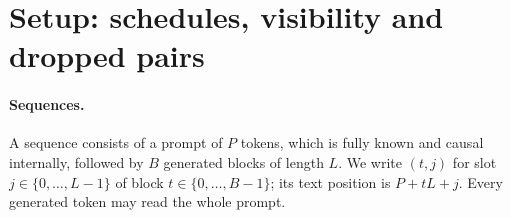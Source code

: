 \documentclass[11pt]{article}
\theoremstyle{definition}
\theoremstyle{remark}
\begin{document}
\section{Setup: schedules, visibility and dropped pairs}
\label{sec:setup}

\paragraph{Sequences.}
A sequence consists of a prompt of $P$ tokens, which is fully known and causal internally, followed by $B$ generated blocks of length $L$.
We write $(t,j)$ for slot $j\in\{0,\dots,L-1\}$ of block $t\in\{0,\dots,B-1\}$; its text position is $P+tL+j$.
Every generated token may read the whole prompt.
\end{document}
